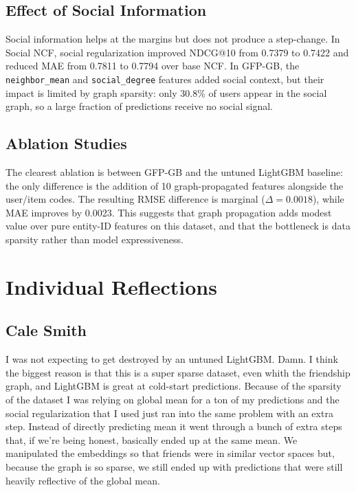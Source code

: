 \documentclass[conference]{IEEEtran}
\begin{document}
\subsection{Effect of Social Information}

Social information helps at the margins but does not produce a step-change. 
In Social NCF, social regularization improved NDCG@10 from 0.7379 to 0.7422 
and reduced MAE from 0.7811 to 0.7794 over base NCF. In GFP-GB, the 
\texttt{neighbor\_mean} and \texttt{social\_degree} features added social 
context, but their impact is limited by graph sparsity: only 30.8\% of users 
appear in the social graph, so a large fraction of predictions receive no social 
signal.

\subsection{Ablation Studies}

The clearest ablation is between GFP-GB and the untuned LightGBM baseline: 
the only difference is the addition of 10 graph-propagated features alongside 
the user/item codes. The resulting RMSE difference is marginal ($\Delta = 
0.0018$), while MAE improves by 0.0023. This suggests that graph propagation 
adds modest value over pure entity-ID features on this dataset, and that the 
bottleneck is data sparsity rather than model expressiveness.

\section{Individual Reflections}
\label{sec:reflections}

\subsection{Cale Smith}
I was not expecting to get destroyed by an untuned LightGBM. Damn. I think the
biggest reason is that this is a super sparse dataset, even whith the
friendship graph, and LightGBM is great at cold-start predictions. Because of
the sparsity of the dataset I was relying on global mean for a ton of my
predictions and the social regularization that I used just ran into the same
problem with an extra step. Instead of directly predicting mean it went through
a bunch of extra steps that, if we're being honest, basically ended up at the
same mean. We manipulated the embeddings so that friends were in similar vector
spaces but, because the graph is so sparse, we still ended up with predictions
that were still heavily reflective of the global mean. 
\end{document}
